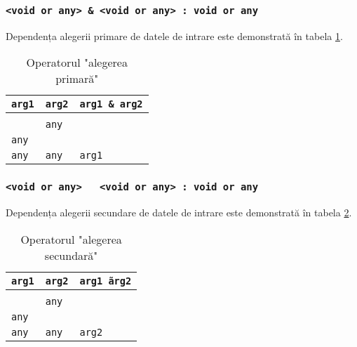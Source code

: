 \subsubsection{\texttt{<void or any> \& <void or any> : void or any}}

Dependența alegerii primare de datele de intrare este demonstrată în tabela \ref{andhacktable}.

\begin{table}[htb]
	\caption{Operatorul "alegerea primară"}
	\label{andhacktable}
	\begin{tabular}{|l|l|l|}
		\hline
		\texttt{arg1} & \texttt{arg2} & \texttt{arg1 \& arg2} \\ \hline
		\void{}     & \void{}     & \void{}   			\\ \hline
		\void{}     & \texttt{any}  & \void{}   			\\ \hline
		\texttt{any}  & \void{}     & \void{}   			\\ \hline
		\texttt{any}  & \texttt{any}  & \texttt{arg1}   		\\ \hline
	\end{tabular}
	\vspace{-2em}
\end{table}

\subsubsection{\texttt{<void or any> ~ <void or any> : void or any}}

Dependența alegerii secundare de datele de intrare este demonstrată în tabela \ref{eqhacktable}.

\begin{table}[htb]
	\caption{Operatorul "alegerea secundară"}
	\label{eqhacktable}
	\begin{tabular}{|l|l|l|}
		\hline
		\texttt{arg1} & \texttt{arg2} & \texttt{arg1 \~ arg2} \\ \hline
		\void{}     & \void{}     & \void{}   			\\ \hline
		\void{}     & \texttt{any}  & \void{}   			\\ \hline
		\texttt{any}  & \void{}     & \void{}   			\\ \hline
		\texttt{any}  & \texttt{any}  & \texttt{arg2}   		\\ \hline
	\end{tabular}
	\vspace{-2em}
\end{table}

